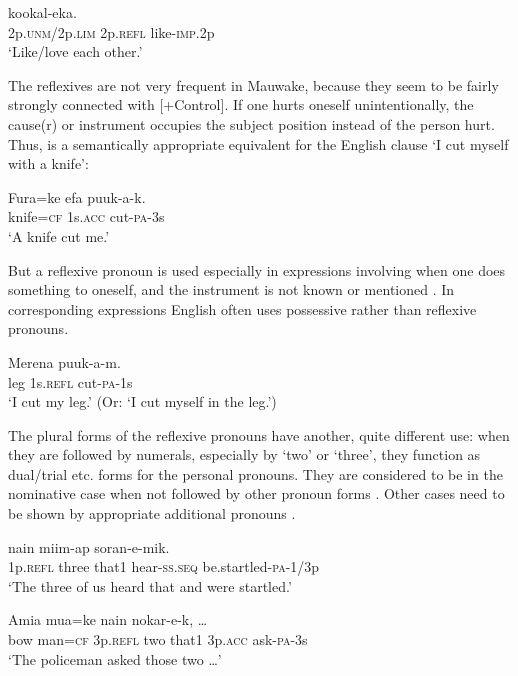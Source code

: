 \ea%
\label{ex:3:x613}
\gll {}  kookal-eka. \\
2p.\textsc{unm}/2p.\textsc{lim} 2p.\textsc{refl} like-\textsc{imp}.2p\\
\glt`Like/love each other.'
\z

The reflexives are not very frequent in Mauwake, because they seem to be fairly strongly connected with [+Control]. If one hurts oneself unintentionally, the cause(r) or instrument occupies the subject position instead of the person hurt. Thus,  is a semantically appropriate equivalent for the English clause `I cut myself with a knife':

\ea%
\label{ex:3:x617}
\gll Fura=ke efa puuk-a-k. \\
knife=\textsc{cf} 1s.\textsc{acc} cut-\textsc{pa}-3s\\
\glt`A knife cut me.'
\z

But a reflexive pronoun is used especially in expressions involving  when one does something to oneself, and the instrument is not known or mentioned . In corresponding expressions English often uses possessive rather than reflexive pronouns.

\ea%
\label{ex:3:x618}
\gll Merena  puuk-a-m. \\
leg 1s.\textsc{refl} cut-\textsc{pa}-1s\\
\glt`I cut my leg.' (Or: `I cut myself in the leg.')
\z

The plural forms of the reflexive pronouns have another, quite different use: when they are followed by numerals, especially by `two' or `three', they function as dual/trial etc. forms for the personal pronouns. They are considered to be in the nominative case when not followed by other pronoun forms . Other cases need to be shown by appropriate additional pronouns .

\ea%
\label{ex:3:x615}
\gll {}  nain miim-ap soran-e-mik. \\
1p.\textsc{refl} three that1 hear-\textsc{ss}.\textsc{seq} be.startled-\textsc{pa}-1/3p\\
\glt`The three of us heard that and were startled.'
\z

\ea%
\label{ex:3:x616}
\gll Amia mua=ke   nain  nokar-e-k, {\dots} \\
bow man=\textsc{cf} 3p.\textsc{refl} two that1 3p.\textsc{acc} ask-\textsc{pa}-3s\\
\glt`The policeman asked those two {\dots}'
\z

